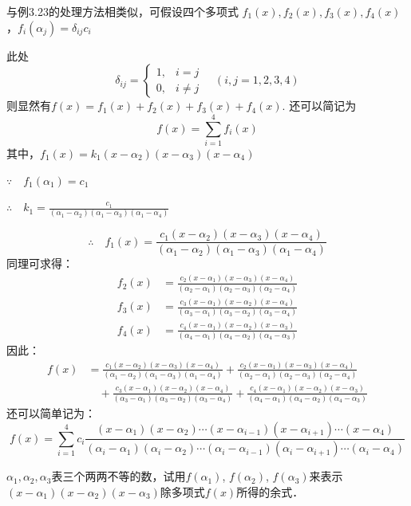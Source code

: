 \begin{solution}
    与例3.23的处理方法相类似，可假设四个多项式
$f_1(x),f_2(x),f_3(x),f_4(x)$，$f_i(\alpha_j)=\delta_{ij}c_i$    
    
    此处$$\delta_{ij}=\begin{cases}
        1,& i=j\\
        0,& i\ne j
    \end{cases}\quad  (i,j=1, 2, 3, 4)$$
则显然有$f(x)=f_1(x)+f_2(x)+f_3(x)+f_4(x)$.
还可以简记为$$f(x)=\sum^4_{i=1}f_i(x)$$
其中，$f_1(x)=k_1(x-\alpha_2)(x-\alpha_3)(x-\alpha_4)$

$\because\quad f_1(\alpha_1)=c_1$

$\therefore\quad k_1=\frac{c_1}{(\alpha_1-\alpha_2)(\alpha_1-\alpha_3)(\alpha_1-\alpha_4)}$

\[\therefore\quad f_1(x)=\frac{c_1(x-\alpha_2)(x-\alpha_3)(x-\alpha_4)}{(\alpha_1-\alpha_2)(\alpha_1-\alpha_3)(\alpha_1-\alpha_4)}\]
同理可求得：
\[\begin{split}
    f_2(x)&=\frac{c_2(x-\alpha_1)(x-\alpha_3)(x-\alpha_4)}{(\alpha_2-\alpha_1)(\alpha_2-\alpha_3)(\alpha_2-\alpha_4)}\\
    f_3(x)&=\frac{c_3(x-\alpha_1)(x-\alpha_2)(x-\alpha_4)}{(\alpha_3-\alpha_1)(\alpha_3-\alpha_2)(\alpha_3-\alpha_4)}\\
    f_4(x)&=\frac{c_4(x-\alpha_1)(x-\alpha_2)(x-\alpha_3)}{(\alpha_4-\alpha_1)(\alpha_4-\alpha_2)(\alpha_4-\alpha_3)}
\end{split}\]
因此：
\[\begin{split}
f(x)&=\frac{c_1(x-\alpha_2)(x-\alpha_3)(x-\alpha_4)}{(\alpha_1-\alpha_2)(\alpha_1-\alpha_3)(\alpha_1-\alpha_4)}+\frac{c_2(x-\alpha_1)(x-\alpha_3)(x-\alpha_4)}{(\alpha_2-\alpha_1)(\alpha_2-\alpha_3)(\alpha_2-\alpha_4)}\\
&\quad +\frac{c_3(x-\alpha_1)(x-\alpha_2)(x-\alpha_4)}{(\alpha_3-\alpha_1)(\alpha_3-\alpha_2)(\alpha_3-\alpha_4)}+\frac{c_4(x-\alpha_1)(x-\alpha_2)(x-\alpha_3)}{(\alpha_4-\alpha_1)(\alpha_4-\alpha_2)(\alpha_4-\alpha_3)}
\end{split}\]
还可以简单记为：
\[f(x)=\sum^4_{i=1} c_i\frac{(x-\alpha_1)(x-\alpha_2)\cdots (x-\alpha_{i-1})(x-\alpha_{i+1})\cdots (x-\alpha_4)}{(\alpha_i-\alpha_1)(\alpha_i-\alpha_2)\cdots (\alpha_i-\alpha_{i-1})(\alpha_i-\alpha_{i+1})\cdots (\alpha_i-\alpha_4)}\]
\end{solution}


\begin{example}
$\alpha_1,\alpha_2,\alpha_3$表三个两两不等的数，试用$f(\alpha_1)$, $f(\alpha_2)$, $f(\alpha_3)$来表示$(x-\alpha_1)(x-\alpha_2)(x-\alpha_3)$除多项式$f(x)$所得的余式．
\end{example}

